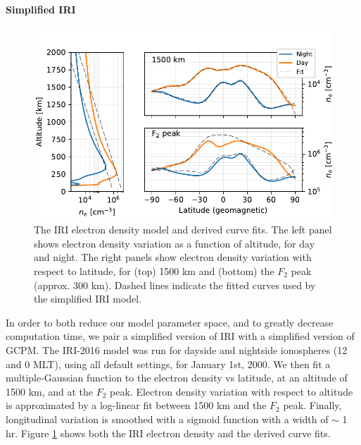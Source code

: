 \paragraph{Simplified IRI}
\begin{figure}[h]
\begin{center}
\includegraphics{figures/iono_profile.pdf}
\caption[Ionosphere density profile]{The IRI electron density model and derived curve fits. The left panel shows electron density variation as a function of altitude, for day and night. The right panels show electron density variation with respect to latitude, for (top) 1500 km and (bottom) the $F_2$ peak (approx. 300 km). Dashed lines indicate the fitted curves used by the simplified IRI model.}
\label{fig:iono_profile}
\end{center}
\end{figure}

In order to both reduce our model parameter space, and to greatly decrease computation time, we pair a simplified version of IRI with a simplified version of GCPM. The IRI-2016 model was run for dayside and nightside ionospheres (12 and 0 MLT), using all default settings, for January 1st, 2000. We then fit a multiple-Gaussian function to the electron density vs latitude, at an altitude of 1500 km, and at the $F_2$ peak. Electron density variation with respect to altitude is approximated by a log-linear fit between 1500 km and the $F_2$ peak. Finally, longitudinal variation is smoothed with a sigmoid function with a width of $\sim$ 1 hr. Figure \ref{fig:iono_profile} shows both the IRI electron density and the derived curve fits.
